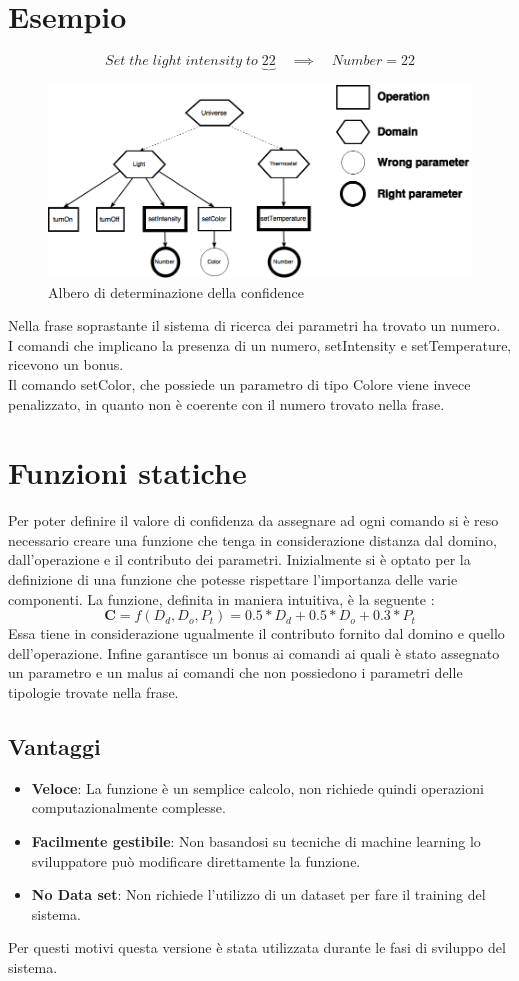 \documentclass[twoside]{supsistudent}
\begin{document}
\section{Esempio}
\[
Set\;the\;light\;intensity\;to\;
\underbrace{22}
\quad\implies\quad Number = 22
\]
\begin{figure}[H]
\centering
\includegraphics[width=\textwidth]{Confidence}
\caption{Albero di determinazione della confidence}
\label{fig:pose}
\end{figure}
Nella frase soprastante il sistema di ricerca dei parametri ha trovato un numero.\\
I comandi che implicano la presenza di un numero, setIntensity e setTemperature, ricevono un bonus.\\
Il comando setColor, che possiede un parametro di tipo Colore viene invece penalizzato, in quanto non è coerente con il numero trovato nella frase.
\section{Funzioni statiche}
Per poter definire il valore di confidenza da assegnare ad ogni comando si è reso necessario creare una funzione che tenga in considerazione distanza dal domino, dall'operazione e il contributo dei parametri.
Inizialmente si è optato per la definizione di una funzione che potesse rispettare l'importanza delle varie componenti.
La funzione, definita in maniera intuitiva, è la seguente :
\[
\boldsymbol{C} = f(D_{d} ,D_{o},P_{t}) = 0.5*D_{d}+0.5*D_{o}+0.3*P_{t}
\]
Essa tiene in considerazione ugualmente il contributo fornito dal domino e quello dell'operazione. Infine garantisce un bonus ai comandi ai quali è stato assegnato un parametro e un malus ai comandi che non possiedono i parametri delle tipologie trovate nella frase.
\subsection{Vantaggi}
\begin{itemize}
  \item \textbf{Veloce}: La funzione è un semplice calcolo, non richiede quindi operazioni computazionalmente complesse.
   \item \textbf{Facilmente gestibile}: Non basandosi su tecniche di machine learning lo sviluppatore può modificare direttamente la funzione.
  \item \textbf{No Data set}: Non richiede l'utilizzo di un dataset per fare il training del sistema.
\end{itemize}
Per questi motivi questa versione è stata utilizzata durante le fasi di sviluppo del sistema.
\end{document}
